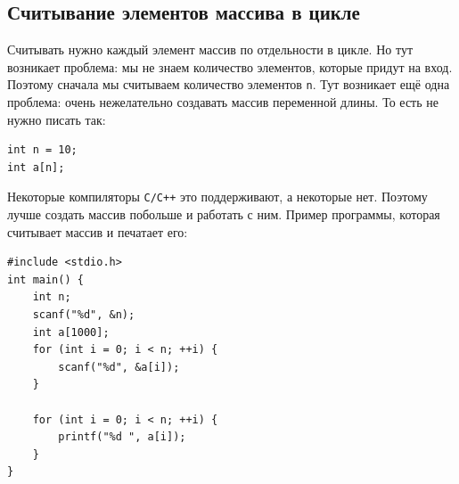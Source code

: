 \documentclass{article}
\begin{document}
\subsection*{Считывание элементов массива в цикле}
Считывать нужно каждый элемент массив по отдельности в цикле. Но тут возникает проблема: мы не знаем количество элементов, которые придут на вход. Поэтому сначала мы считываем количество элементов \texttt{n}. Тут возникает ещё одна проблема: очень нежелательно создавать массив переменной длины. То есть не нужно писать так:
\begin{lstlisting}
int n = 10;
int a[n];
\end{lstlisting}
Некоторые компиляторы \texttt{С/C++} это поддерживают, а некоторые нет. Поэтому лучше создать массив побольше и работать с ним. Пример программы, которая считывает массив и печатает его:
\begin{lstlisting}
#include <stdio.h>
int main() {
    int n;
    scanf("%d", &n);
    int a[1000];
    for (int i = 0; i < n; ++i) {
        scanf("%d", &a[i]);
    }
    
    for (int i = 0; i < n; ++i) {
        printf("%d ", a[i]);
    }    
}
\end{lstlisting}

\newpage
\end{document}
